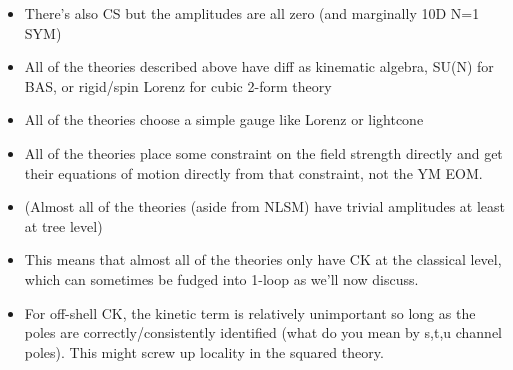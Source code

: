 \documentclass[11pt,letter]{article}
\begin{document}
\begin{itemize}
\item There's also CS but the amplitudes are all zero (and marginally 10D N=1 SYM)
\item All of the theories described above have diff as kinematic algebra, SU(N) for BAS, or rigid/spin Lorenz for cubic 2-form theory
\item All of the theories choose a simple gauge like Lorenz or lightcone
\item All of the theories place some constraint on the field strength directly and get their equations of motion directly from that constraint, not the YM EOM.
\item (Almost all of the theories (aside from NLSM) have trivial amplitudes at least at tree level)
\item This means that almost all of the theories only have CK at the classical level, which can sometimes be fudged into 1-loop as we'll now discuss.
\item For off-shell CK, the kinetic term is relatively unimportant so long as the poles are correctly/consistently identified (what do you mean by s,t,u channel poles).  This might screw up locality in the squared theory.
\end{itemize}
\end{document}

